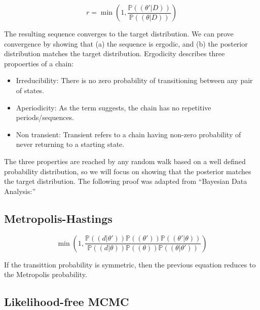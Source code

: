 \documentclass[]{book}
\begin{document}
\begin{equation}
r = \min\left(1, \frac{{\mathbb{P}\left(\left(\theta'|D\right)\right) }}{{\mathbb{P}\left(\left(\theta|D\right)\right) }}\right)
\end{equation}

The resulting sequence converges to the target distribution. We can prove
convergence by showing that (a) the sequence is ergodic, and (b) the posterior
distribution matches the target distribution. Ergodicity describes three
propoerties of a chain:

\begin{itemize}
\item
  Irreducibility: There is no zero probability of transitioning between any pair of states.
\item
  Aperiodicity: As the term suggests, the chain has no repetitive periods/sequences.
\item
  Non transient: Transient refers to a chain having non-zero probability of
  never returning to a starting state.
\end{itemize}

The three properties are reached by any random walk based on a well defined
probability distribution, so we will focus on showing that the posterior matches
the target distribution. The following proof was adapted from ``Bayesian Data
Analysis:''

\hypertarget{metropolis-hastings}{%
\subsection{Metropolis-Hastings}\label{metropolis-hastings}}

\[
\min\left(1, \frac{{\mathbb{P}\left(\left(d|\theta'\right)\right) }{\mathbb{P}\left(\left(\theta'\right)\right) }{\mathbb{P}\left(\left(\theta'|\theta\right)\right) }}{{\mathbb{P}\left(\left(d|\theta\right)\right) }{\mathbb{P}\left(\left(\theta\right)\right) }{\mathbb{P}\left(\left(\theta|\theta'\right)\right) }}\right)
\]

If the transittion probability is symmetric, then the previous equation reduces
to the Metropolis probability.

\hypertarget{likelihood-free-mcmc}{%
\subsection{Likelihood-free MCMC}\label{likelihood-free-mcmc}}
\end{document}
